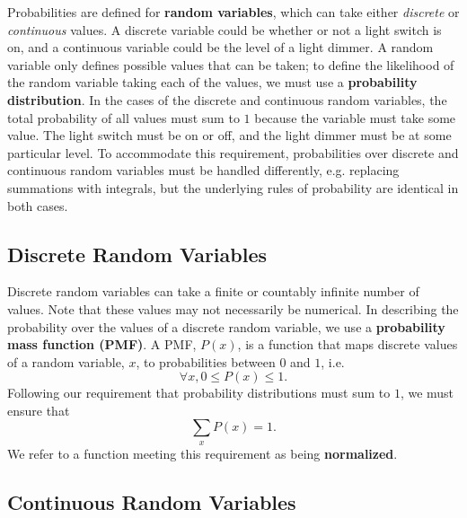 Probabilities are defined for \textbf{random variables}, which can take either \textit{discrete} or \textit{continuous} values. A discrete variable could be whether or not a light switch is on, and a continuous variable could be the level of a light dimmer. A random variable only defines possible values that can be taken; to define the likelihood of the random variable taking each of the values, we must use a \textbf{probability distribution}. In the cases of the discrete and continuous random variables, the total probability of all values must sum to $1$ because the variable must take some value. The light switch must be on or off, and the light dimmer must be at some particular level. To accommodate this requirement, probabilities over discrete and continuous random variables must be handled differently, e.g. replacing summations with integrals, but the underlying rules of probability are identical in both cases.

\subsection{Discrete Random Variables}

Discrete random variables can take a finite or countably infinite number of values. Note that these values may not necessarily be numerical. In describing the probability over the values of a discrete random variable, we use a \textbf{probability mass function (PMF)}. A PMF, $P(x)$, is a function that maps discrete values of a random variable, $x$, to probabilities between $0$ and $1$, i.e.
$$\forall x, 0 \leq P(x) \leq 1. $$
Following our requirement that probability distributions must sum to $1$, we must ensure that
$$ \sum_x P(x) = 1. $$
We refer to a function meeting this requirement as being \textbf{normalized}. 

\subsection{Continuous Random Variables}

